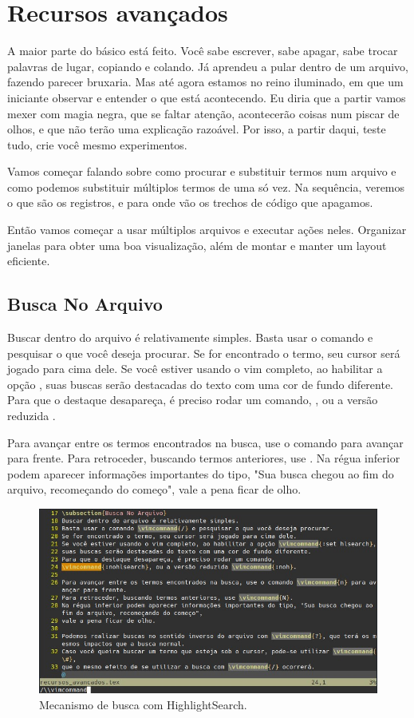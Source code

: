 \section{Recursos avançados}
A maior parte do básico está feito.
Você sabe escrever, sabe apagar, sabe trocar palavras de lugar, copiando e colando.
Já aprendeu a pular dentro de um arquivo, fazendo parecer bruxaria.
Mas até agora estamos no reino iluminado, em que um iniciante observar e entender o que está acontecendo.
Eu diria que a partir vamos mexer com magia negra, que se faltar atenção, acontecerão coisas num piscar de olhos,
e que não terão uma explicação razoável.
Por isso, a partir daqui, teste tudo, crie você mesmo experimentos.

Vamos começar falando sobre como procurar e substituir termos num arquivo e
como podemos substituir múltiplos termos de uma só vez.
Na sequência, veremos o que são os registros, e para onde vão os trechos de código que apagamos.

Então vamos começar a usar múltiplos arquivos e executar ações neles.
Organizar janelas para obter uma boa visualização, além de montar e manter um layout eficiente.

\subsection{Busca No Arquivo}
Buscar dentro do arquivo é relativamente simples.
Basta usar o comando \vimcommand{/} e pesquisar o que você deseja procurar.
Se for encontrado o termo, seu cursor será jogado para cima dele.
Se você estiver usando o vim completo, ao habilitar a opção ,
suas buscas serão destacadas do texto com uma cor de fundo diferente.
Para que o destaque desapareça, é preciso rodar um comando,
, ou a versão reduzida . 

Para avançar entre os termos encontrados na busca, use o comando  para avançar para frente.
Para retroceder, buscando termos anteriores, use .
Na régua inferior podem aparecer informações importantes do tipo, "Sua busca chegou ao fim do arquivo, recomeçando do começo",
vale a pena ficar de olho.

\begin{figure}[!htb]
\centering
\includegraphics[scale=0.70]{recursos_avancados/Busca_No_Arquivo.jpg}
\caption{Mecanismo de busca com HighlightSearch.}
\end{figure}

